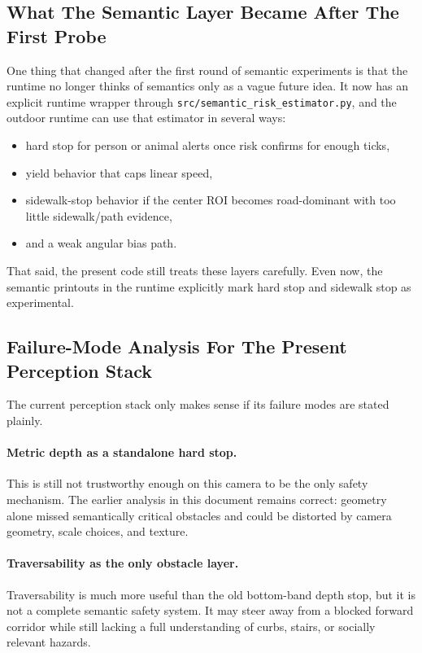 \documentclass[11pt]{article}
\begin{document}
\subsection{What The Semantic Layer Became After The First Probe}
One thing that changed after the first round of semantic experiments is that the runtime no longer thinks of semantics only as a vague future idea. It now has an explicit runtime wrapper through \texttt{src/semantic\_risk\_estimator.py}, and the outdoor runtime can use that estimator in several ways:
\begin{itemize}[leftmargin=*]
\item hard stop for person or animal alerts once risk confirms for enough ticks,
\item yield behavior that caps linear speed,
\item sidewalk-stop behavior if the center ROI becomes road-dominant with too little sidewalk/path evidence,
\item and a weak angular bias path.
\end{itemize}

That said, the present code still treats these layers carefully. Even now, the semantic printouts in the runtime explicitly mark hard stop and sidewalk stop as experimental.

\subsection{Failure-Mode Analysis For The Present Perception Stack}
The current perception stack only makes sense if its failure modes are stated plainly.

\paragraph{Metric depth as a standalone hard stop.}
This is still not trustworthy enough on this camera to be the only safety mechanism. The earlier analysis in this document remains correct: geometry alone missed semantically critical obstacles and could be distorted by camera geometry, scale choices, and texture.

\paragraph{Traversability as the only obstacle layer.}
Traversability is much more useful than the old bottom-band depth stop, but it is not a complete semantic safety system. It may steer away from a blocked forward corridor while still lacking a full understanding of curbs, stairs, or socially relevant hazards.
\end{document}
